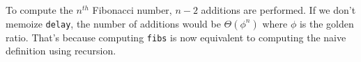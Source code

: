 \documentclass[a4paper,12pt]{article}
\begin{document}
To compute the $n^{th}$ Fibonacci number, $n-2$ additions are
performed.  If we don't memoize \lstinline!delay!, the number of
additions would be $\Theta(\phi^n)$ where $\phi$ is the golden ratio.
That's because computing \lstinline!fibs! is now equivalent to
computing the naive definition using recursion.
\end{document}
